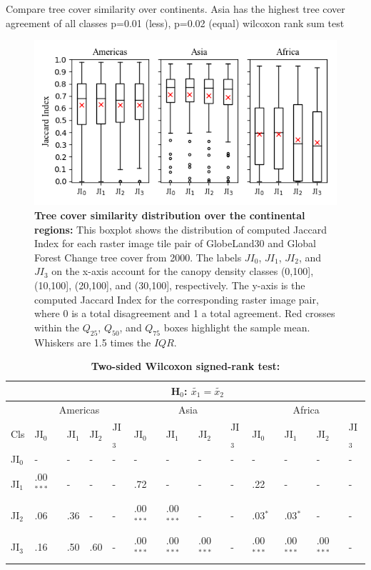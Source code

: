 			 Compare tree cover similarity over continents. Asia has the highest tree cover agreement of all classes p=0.01 (less), p=0.02 (equal) wilcoxon rank sum test
			\begin{figure}[ht]
				\centering
				\includegraphics[scale=1]{img/jaccard}
				\caption[Tree cover similarity distribution of the continental regions]{\textbf{Tree cover similarity distribution over the continental regions:} This boxplot shows the distribution of computed Jaccard Index for each raster image tile pair of GlobeLand30 and Global Forest Change tree cover from 2000. The labels $JI_0$, $JI_1$, $JI_2$, and $JI_3$ on the x-axis account for the canopy density classes (0,100], (10,100], (20,100], and (30,100], respectively. The y-axis is the computed Jaccard Index for the corresponding raster image pair, where 0 is a total disagreement and 1 a total agreement. Red crosses within the $Q_{25}$, $Q_{50}$, and $Q_{75}$ boxes highlight the sample mean. Whiskers are 1.5 times the $IQR$.}
				\label{fig:jaccard}
			\end{figure}
			\begin{table}[ht]
				\centering
				\caption[Two-sided Wilcoxon signed-rank test]{\textbf{Two-sided Wilcoxon signed-rank test:}}
				\label{tab:wilcoxontwosided}
				\begin{tabular}{lllllllllllll}
					\hline
					& \multicolumn{12}{c}{H$_0$: $\tilde{x_1}=\tilde{x_2}$} \\\hline
					& \multicolumn{4}{c}{Americas} & \multicolumn{4}{c}{Asia} & \multicolumn{4}{c}{Africa} \\
					Cls & JI$_0$ & JI$_1$ & JI$_2$ & JI$_3$ & JI$_0$ & JI$_1$ & JI$_2$ & JI$_3$ & JI$_0$ & JI$_1$ & JI$_2$ & JI$_3$ \\\hline
					JI$_0$ & - & - & - & - & - & - & - & - & - & - & - & - \\
					JI$_1$ & .00$^{***}$ & - & - & - & .72 & - & - & - & .22 & - & - & - \\
					JI$_2$ & .06 & .36 & - & - & .00$^{***}$ & .00$^{***}$ & - & - & .03$^{*}$ & .03$^{*}$  & - & - \\
					JI$_3$ & .16 & .50 & .60 & - & .00$^{***}$ & .00$^{***}$ & .00$^{***}$ & - & .00$^{***}$ & .00$^{***}$ & .00$^{***}$ & - \\\hline
				\end{tabular}
			\end{table}
